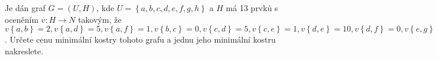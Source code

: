 \subsubsection{}
Je dán graf $G=(U,H)$, kde $U=\left \{a,b,c,d,e,f,g,h  \right \}$ a $H$ má 13
prvků s oceněním $v:H\rightarrow N$ takovým, že $v\left \{ a,b \right \}=2,
v\left \{ a,d \right \}=5, v\left \{ a,f \right \}=1, v\left \{ b,c \right \}=0,
v\left \{ c,d \right \}=5, v\left \{ c,e \right \}=1, v\left \{ d,e \right \}=10,
v\left \{ d,f \right \}=0, v\left \{ e,g \right \}=3, v\left \{ e,h \right \}=3,
v\left \{ f,g \right \}=1, v\left \{ f,h \right \}=2, v\left \{ g,h \right \}=6 $. 
Určete cenu minimální kostry tohoto grafu a jednu jeho minimální kostru
nakreslete.
